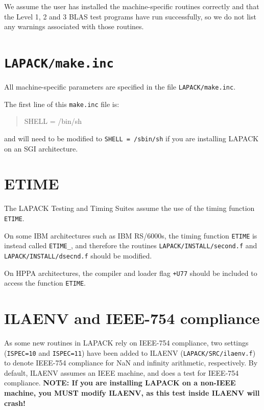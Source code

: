 \documentclass[11pt]{report}
\begin{document}
We assume the user has installed the machine-specific routines
correctly and that the Level 1, 2 and 3 BLAS test programs have run
successfully, so we do not list any warnings associated with those
routines.

\section{\texttt{LAPACK/make.inc}}

All machine-specific
parameters are specified in the file \texttt{LAPACK/make.inc}.

The first line of this \texttt{make.inc} file is:
\begin{quote}
SHELL = /bin/sh
\end{quote}
and will need to be modified to \texttt{SHELL = /sbin/sh} if you are
installing LAPACK on an SGI architecture.

\section{ETIME}

The LAPACK Testing
and Timing Suites assume the use of the timing function \texttt{ETIME}.

On some IBM architectures such as IBM RS/6000s, the timing function
\texttt{ETIME} is instead called \texttt{ETIME\_}, and therefore the routines
\texttt{LAPACK/INSTALL/second.f} and \texttt{LAPACK/INSTALL/dsecnd.f} should
be modified.

On HPPA architectures,
the compiler and loader flag \texttt{+U77} should be included to access
the function \texttt{ETIME}.

\section{ILAENV and IEEE-754 compliance}

%

As some new routines in LAPACK rely on IEEE-754 compliance,
two settings (\texttt{ISPEC=10} and \texttt{ISPEC=11}) have been added to ILAENV
(\texttt{LAPACK/SRC/ilaenv.f}) to denote IEEE-754 compliance for NaN and
infinity arithmetic, respectively.  By default, ILAENV assumes an IEEE
machine, and does a test for IEEE-754 compliance.  \textbf{NOTE:  If you
are installing LAPACK on a non-IEEE machine, you MUST modify ILAENV,
as this test inside ILAENV will crash!}
\end{document}
